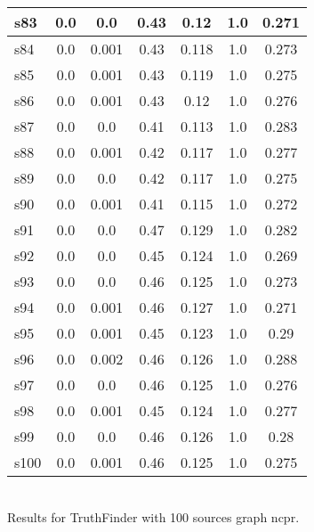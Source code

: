 \documentclass{article}
\begin{document}
\begin{tabular}{|l|c|c|c|c|c|c|}
\hline
s83 &0.0 & 0.0 & 0.43 & 0.12 & 1.0 & 0.271\\
\hline
s84 &0.0 & 0.001 & 0.43 & 0.118 & 1.0 & 0.273\\
\hline
s85 &0.0 & 0.001 & 0.43 & 0.119 & 1.0 & 0.275\\
\hline
s86 &0.0 & 0.001 & 0.43 & 0.12 & 1.0 & 0.276\\
\hline
s87 &0.0 & 0.0 & 0.41 & 0.113 & 1.0 & 0.283\\
\hline
s88 &0.0 & 0.001 & 0.42 & 0.117 & 1.0 & 0.277\\
\hline
s89 &0.0 & 0.0 & 0.42 & 0.117 & 1.0 & 0.275\\
\hline
s90 &0.0 & 0.001 & 0.41 & 0.115 & 1.0 & 0.272\\
\hline
s91 &0.0 & 0.0 & 0.47 & 0.129 & 1.0 & 0.282\\
\hline
s92 &0.0 & 0.0 & 0.45 & 0.124 & 1.0 & 0.269\\
\hline
s93 &0.0 & 0.0 & 0.46 & 0.125 & 1.0 & 0.273\\
\hline
s94 &0.0 & 0.001 & 0.46 & 0.127 & 1.0 & 0.271\\
\hline
s95 &0.0 & 0.001 & 0.45 & 0.123 & 1.0 & 0.29\\
\hline
s96 &0.0 & 0.002 & 0.46 & 0.126 & 1.0 & 0.288\\
\hline
s97 &0.0 & 0.0 & 0.46 & 0.125 & 1.0 & 0.276\\
\hline
s98 &0.0 & 0.001 & 0.45 & 0.124 & 1.0 & 0.277\\
\hline
s99 &0.0 & 0.0 & 0.46 & 0.126 & 1.0 & 0.28\\
\hline
s100 &0.0 & 0.001 & 0.46 & 0.125 & 1.0 & 0.275\\
\hline
\end{tabular}\\

\noindent Results for TruthFinder with 100 sources graph ncpr.
\end{document}
